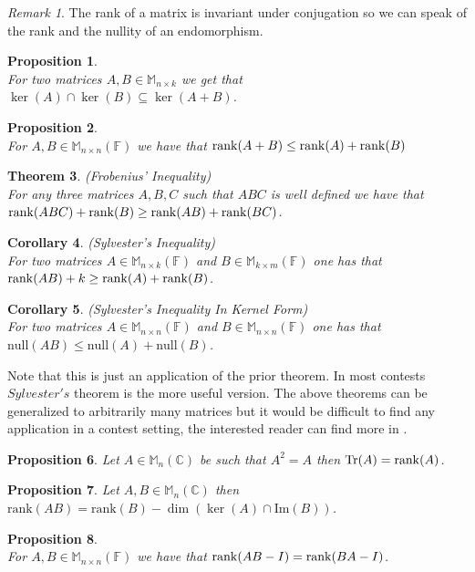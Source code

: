 \documentclass[12pt]{article}
\newcommand{\Rank}{\mathrm{rank}}
\newcommand{\Null}{\mathrm{null}}
\newtheorem{theorem}{Theorem}[section]
\newtheorem{corollary}[theorem]{Corollary}
\newtheorem{prop}[theorem]{Proposition}
\theoremstyle{definition}
\theoremstyle{remark}
\newtheorem*{remark}{Remark}
\theoremstyle{plain}
\begin{document}
\begin{remark}
    The rank of a matrix is invariant under conjugation so we can speak of the rank and the nullity of an endomorphism.
\end{remark}
\begin{prop}\leavevmode \\
   For two matrices $A,B \in\mathbb{M}_{n\times k}$ we get that $\ker(A)\cap \ker(B)\subseteq \ker(A+B)$.
\end{prop}
\begin{prop}\leavevmode \\
    For $A,B\in\mathbb{M}_{n\times n}(\mathbb{F})$ we have that $\rank(A+B)\leq 
    \rank(A)+\rank(B)$
\end{prop}
\begin{theorem}\textup{(Frobenius' Inequality)}\\
    For any three matrices $A,B,C$ such that $ABC$ is well defined we have that $\rank(ABC)+\rank(B)\geq \rank(AB)+\rank(BC)$.
\end{theorem}
\begin{corollary}\textup{(Sylvester's Inequality)}\\
For two matrices $A\in\mathbb{M}_{n\times k}(\mathbb{F})$ and $B\in\mathbb{M}_{k\times m}(\mathbb{F})$ one has that $\rank(AB)+k\geq \rank(A)+\rank(B)$.
\end{corollary}
\begin{corollary}\textup{(Sylvester's Inequality In Kernel Form)}\\
    For two matrices $A\in\mathbb{M}_{n\times n}(\mathbb{F})$ and $B\in\mathbb{M}_{n\times n}(\mathbb{F})$ one has that $\Null(AB)\leq \Null(A)+\Null(B)$.
\end{corollary}
Note that this is just an application of the prior theorem. In most contests $Sylvester's$ theorem is the more useful version. The above theorems can be generalized to arbitrarily many matrices but it would be difficult to find any application in a contest setting, the interested reader can find more in \cite{T}.
\begin{prop}
    Let $A\in \mathbb{M}_n(\mathbb{C})$ be such that $A^2=A$ then $\Tr(A)=\rank(A)$.
\end{prop}
\begin{prop}
    Let $A,B\in \mathbb{M}_n(\mathbb{C})$ then $\Rank(AB)=\Rank(B)-\dim(\ker(A)\cap \mathrm{Im}(B))$.
\end{prop}
\begin{prop}\leavevmode \\
    For $A,B\in\mathbb{M}_{n\times n}(\mathbb{F})$ we have that $\rank(AB-I)=\rank(BA-I)$.
\end{prop}
\end{document}
